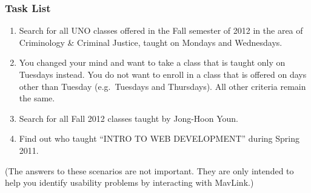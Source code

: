 \subsubsection*{Task List}
\begin{enumerate}
	\item Search for all UNO classes offered in the Fall semester of 2012 in the area of Criminology \& Criminal Justice, taught on Mondays and Wednesdays.
	\item You changed your mind and want to take a class that is taught only on Tuesdays instead. You do not want to enroll in a class that is offered on days other than Tuesday (e.g.\ Tuesdays and Thursdays).  All other criteria remain the same.
	\item Search for all Fall 2012 classes taught by Jong-Hoon Youn.
	\item Find out who taught ``INTRO TO WEB DEVELOPMENT'' during Spring 2011.
\end{enumerate}

(The answers to these scenarios are not important.  They are only intended to help you identify usability problems by interacting with MavLink.)